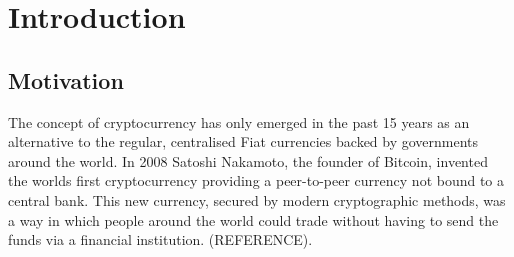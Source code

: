 \documentclass{l4proj}
\begin{document}
%
%
%
%
%
%
%
%
\chapter{Introduction}


\section{Motivation}

The concept of cryptocurrency has only emerged in the past 15 years as an alternative to the regular,
centralised Fiat currencies backed by governments around the world. In 2008 Satoshi Nakamoto, the 
founder of Bitcoin, invented the worlds first cryptocurrency providing a peer-to-peer currency
not bound to a central bank. This new currency, secured by modern cryptographic methods, was a way in
which people around the world could trade without having to send the funds via a financial institution. (REFERENCE).
\end{document}
